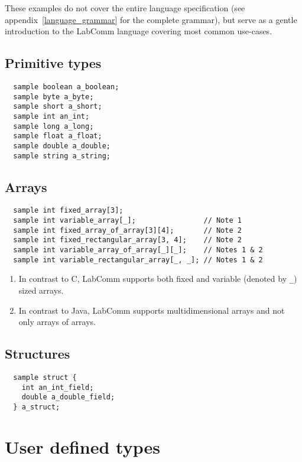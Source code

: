 \documentclass[a4paper]{article}
\begin{document}
These examples do not cover the entire language
specification (see appendix~\ref{language_grammar} for the complete
grammar), but serve as a gentle introduction to the LabComm
language covering most common use-cases.

\subsection{Primitive types}

\begin{verbatim}
  sample boolean a_boolean;
  sample byte a_byte;
  sample short a_short;
  sample int an_int;
  sample long a_long;
  sample float a_float;
  sample double a_double;
  sample string a_string;
\end{verbatim}

\subsection{Arrays}

\begin{verbatim}
  sample int fixed_array[3];
  sample int variable_array[_];                // Note 1
  sample int fixed_array_of_array[3][4];       // Note 2
  sample int fixed_rectangular_array[3, 4];    // Note 2
  sample int variable_array_of_array[_][_];    // Notes 1 & 2
  sample int variable_rectangular_array[_, _]; // Notes 1 & 2
\end{verbatim}

\begin{enumerate}
\item In contrast to C, LabComm supports both fixed and variable (denoted
by \verb+_+) sized arrays.

\item In contrast to Java, LabComm supports multidimensional arrays and not
only arrays of arrays.

\end{enumerate}

\subsection{Structures}

\begin{verbatim}
  sample struct {
    int an_int_field;
    double a_double_field;
  } a_struct;
\end{verbatim}

\section{User defined types}
\end{document}
